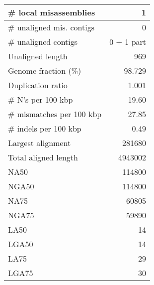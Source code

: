 \documentclass[12pt,a4paper]{article}
\begin{document}
\begin{table}[ht]
\begin{center}
\begin{tabular}{|l*{1}{|r}|}
\# local misassemblies & 1 \\ \hline
\# unaligned mis. contigs & 0 \\ \hline
\# unaligned contigs & 0 + 1 part \\ \hline
Unaligned length & 969 \\ \hline
Genome fraction (\%) & 98.729 \\ \hline
Duplication ratio & 1.001 \\ \hline
\# N's per 100 kbp & 19.60 \\ \hline
\# mismatches per 100 kbp & 27.85 \\ \hline
\# indels per 100 kbp & 0.49 \\ \hline
Largest alignment & 281680 \\ \hline
Total aligned length & 4943002 \\ \hline
NA50 & 114800 \\ \hline
NGA50 & 114800 \\ \hline
NA75 & 60805 \\ \hline
NGA75 & 59890 \\ \hline
LA50 & 14 \\ \hline
LGA50 & 14 \\ \hline
LA75 & 29 \\ \hline
LGA75 & 30 \\ \hline
\end{tabular}
\end{center}
\end{table}
\end{document}

